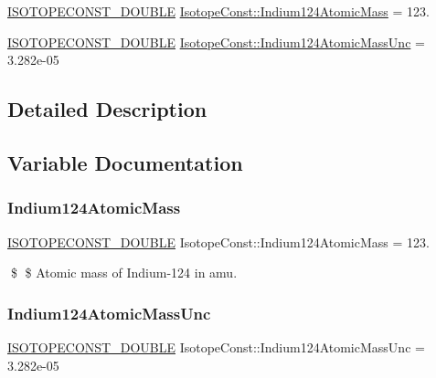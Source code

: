 \begin{DoxyCompactItemize}
\item 
\mbox{\hyperlink{group___isotope_const-_macros_ga8f45a7272ce02c0b4c65c44636ed719a}{I\+S\+O\+T\+O\+P\+E\+C\+O\+N\+S\+T\+\_\+\+D\+O\+U\+B\+LE}} \mbox{\hyperlink{group___isotope_const-_indium-_in124_ga51b39952efbd81ee748a89a3a898cd2e}{Isotope\+Const\+::\+Indium124\+Atomic\+Mass}} = 123.
\item 
\mbox{\hyperlink{group___isotope_const-_macros_ga8f45a7272ce02c0b4c65c44636ed719a}{I\+S\+O\+T\+O\+P\+E\+C\+O\+N\+S\+T\+\_\+\+D\+O\+U\+B\+LE}} \mbox{\hyperlink{group___isotope_const-_indium-_in124_ga1ff575a32cb6202abaf19ebf8a8c24ba}{Isotope\+Const\+::\+Indium124\+Atomic\+Mass\+Unc}} = 3.\+282e-\/05
\end{DoxyCompactItemize}


\subsection{Detailed Description}


\subsection{Variable Documentation}
\mbox{\label{group___isotope_const-_indium-_in124_ga51b39952efbd81ee748a89a3a898cd2e}} 
\subsubsection{\texorpdfstring{Indium124\+Atomic\+Mass}{Indium124AtomicMass}}
{\footnotesize\ttfamily \mbox{\hyperlink{group___isotope_const-_macros_ga8f45a7272ce02c0b4c65c44636ed719a}{I\+S\+O\+T\+O\+P\+E\+C\+O\+N\+S\+T\+\_\+\+D\+O\+U\+B\+LE}} Isotope\+Const\+::\+Indium124\+Atomic\+Mass = 123.}

\$ \$ Atomic mass of Indium-\/124 in amu. \mbox{\label{group___isotope_const-_indium-_in124_ga1ff575a32cb6202abaf19ebf8a8c24ba}} 
\subsubsection{\texorpdfstring{Indium124\+Atomic\+Mass\+Unc}{Indium124AtomicMassUnc}}
{\footnotesize\ttfamily \mbox{\hyperlink{group___isotope_const-_macros_ga8f45a7272ce02c0b4c65c44636ed719a}{I\+S\+O\+T\+O\+P\+E\+C\+O\+N\+S\+T\+\_\+\+D\+O\+U\+B\+LE}} Isotope\+Const\+::\+Indium124\+Atomic\+Mass\+Unc = 3.\+282e-\/05}

